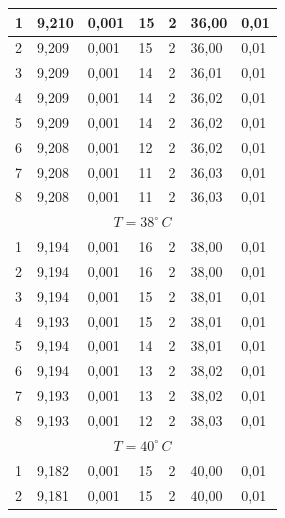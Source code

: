 \documentclass[10pt,a4paper]{article}
\begin{document}
\begin{longtable}[h!]{|l|l|l|l|l|l|l|}
1 & 9,210  & 0,001 & 15 & 2                      & 36,00 & 0,01                      \\ \hline
2 & 9,209  & 0,001 & 15 & 2                      & 36,00 & 0,01                      \\ \hline
3 & 9,209  & 0,001 & 14 & 2                      & 36,01 & 0,01                      \\ \hline
4 & 9,209  & 0,001 & 14 & 2                      & 36,02 & 0,01                      \\ \hline
5 & 9,209  & 0,001 & 14 & 2                      & 36,02 & 0,01                      \\ \hline
6 & 9,208  & 0,001 & 12 & 2                      & 36,02 & 0,01                      \\ \hline
7 & 9,208  & 0,001 & 11 & 2                      & 36,03 & 0,01                      \\ \hline
8 & 9,208  & 0,001 & 11 & 2                      & 36,03 & 0,01                      \\ \hline
\multicolumn{7}{|c|}{$T = 38^{\circ}\,C$}                                            \\ \hline
1 & 9,194  & 0,001 & 16 & 2                      & 38,00 & 0,01                      \\ \hline
2 & 9,194  & 0,001 & 16 & 2                      & 38,00 & 0,01                      \\ \hline
3 & 9,194  & 0,001 & 15 & 2                      & 38,01 & 0,01                      \\ \hline
4 & 9,193  & 0,001 & 15 & 2                      & 38,01 & 0,01                      \\ \hline
5 & 9,194  & 0,001 & 14 & 2                      & 38,01 & 0,01                      \\ \hline
6 & 9,194  & 0,001 & 13 & 2                      & 38,02 & 0,01                      \\ \hline
7 & 9,193  & 0,001 & 13 & 2                      & 38,02 & 0,01                      \\ \hline
8 & 9,193  & 0,001 & 12 & 2                      & 38,03 & 0,01                      \\ \hline
\multicolumn{7}{|c|}{$T = 40^{\circ}\,C$}                                            \\ \hline
1 & 9,182  & 0,001 & 15 & 2                      & 40,00 & 0,01                      \\ \hline
2 & 9,181  & 0,001 & 15 & 2                      & 40,00 & 0,01                      \\ \hline

\end{longtable}
\end{document}
